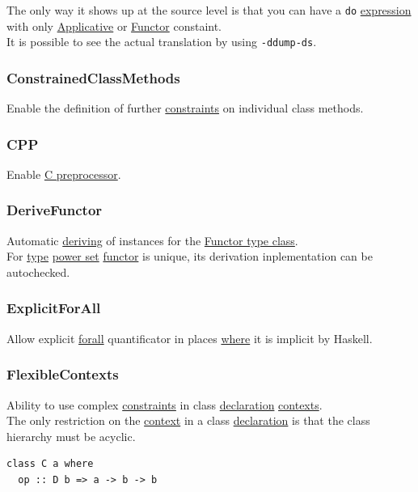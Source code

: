\documentclass[a4paper,14pt,oneside]{book}
\begin{document}
{The only way it shows up at the source level is that you can have a \texttt{do} \hyperref[org4f4ad69]{expression} with only \hyperref[org812e4b8]{Applicative} or \hyperref[orgba8e41d]{Functor} constaint.\\

It is possible to see the actual translation by using \texttt{-ddump-ds}.\\

\subsubsection{\label{org40e4ef5}ConstrainedClassMethods}
\label{sec:orgf9d2932}
Enable the definition of further \hyperref[org4e024c9]{constraints} on individual class methods.\\

\subsubsection{\label{orge2c93cb}CPP}
\label{sec:orgf66510c}
Enable \href{https://en.wikipedia.org/wiki/C\_preprocessor}{C preprocessor}.\\

\subsubsection{\label{org63501c4}DeriveFunctor}
\label{sec:org536bb1f}
Automatic \hyperref[org9b690e2]{deriving} of instances for the \hyperref[org141d91c]{Functor type class}.\\
For \hyperref[orga9ca243]{type} \hyperref[org568270c]{power set} \hyperref[orgba8e41d]{functor} is unique, its derivation inplementation can be autochecked.\\

\subsubsection{\label{org4aa70b2}ExplicitForAll}
\label{sec:org15b5088}
Allow explicit \hyperref[org99c9fb1]{forall} quantificator in places \hyperref[org5b6b021]{where} it is implicit by Haskell.\\

\subsubsection{\label{orgb50b16b}FlexibleContexts}
\label{sec:orgae0f3b6}
Ability to use complex \hyperref[org4e024c9]{constraints} in class \hyperref[org07f2519]{declaration} \hyperref[org193ef53]{contexts}.\\
The only restriction on the \hyperref[orgae1fb98]{context} in a class \hyperref[org07f2519]{declaration} is that the class hierarchy must be acyclic.\\
\begin{verbatim}
class C a where
  op :: D b => a -> b -> b


\end{verbatim}}
\end{document}
